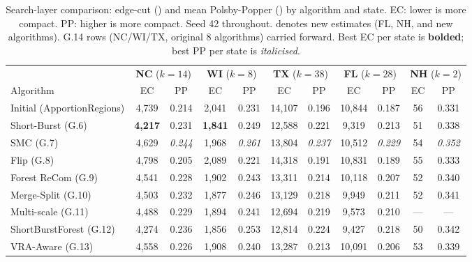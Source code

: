 \begin{table}[ht]
\centering
\caption{%
  Search-layer comparison: edge-cut (\ec{}) and mean Polsby-Popper (\pp{})
  by algorithm and state.
  EC: lower is more compact. PP: higher is more compact.
  Seed 42 throughout.
  \dag{} denotes new estimates (FL, NH, and new algorithms).
  G.14 rows (NC/WI/TX, original 8 algorithms) carried forward.
  Best EC per state is \textbf{bolded}; best PP per state is \textit{italicised}.
}
\label{tab:search-compact}
\scriptsize
\begin{tabular}{@{}l
  cc cc cc cc cc
  @{}}
\toprule
 & \multicolumn{2}{c}{\textbf{NC} ($k=14$)}
 & \multicolumn{2}{c}{\textbf{WI} ($k=8$)}
 & \multicolumn{2}{c}{\textbf{TX} ($k=38$)}
 & \multicolumn{2}{c}{\textbf{FL} ($k=28$)\dag{}}
 & \multicolumn{2}{c}{\textbf{NH} ($k=2$)\dag{}} \\
\cmidrule(lr){2-3}\cmidrule(lr){4-5}\cmidrule(lr){6-7}
\cmidrule(lr){8-9}\cmidrule(lr){10-11}
Algorithm & EC & PP & EC & PP & EC & PP & EC & PP & EC & PP \\
\midrule
Initial (ApportionRegions) & 4{,}739 & 0.214 & 2{,}041 & 0.231 & 14{,}107 & 0.196 & \dag{}10{,}844 & \dag{}0.187 & \dag{}56 & \dag{}0.331 \\
\midrule
Short-Burst (G.6)       & \textbf{4{,}217} & 0.231 & \textbf{1{,}841} & 0.249 & 12{,}588 & 0.221 & \dag{}9{,}319 & \dag{}0.213 & \dag{}51 & \dag{}0.338 \\
SMC (G.7)               & 4{,}629 & \textit{0.244} & 1{,}968 & \textit{0.261} & 13{,}804 & \textit{0.237} & \dag{}10{,}512 & \dag{}\textit{0.229} & \dag{}54 & \dag{}\textit{0.352} \\
Flip (G.8)              & 4{,}798 & 0.205 & 2{,}089 & 0.221 & 14{,}318 & 0.191 & \dag{}10{,}831 & \dag{}0.189 & \dag{}55 & \dag{}0.333 \\
Forest ReCom (G.9)      & 4{,}541 & 0.228 & 1{,}902 & 0.243 & 13{,}311 & 0.214 & \dag{}10{,}118 & \dag{}0.207 & \dag{}52 & \dag{}0.340 \\
Merge-Split (G.10)      & 4{,}503 & 0.232 & 1{,}877 & 0.246 & 13{,}129 & 0.218 & \dag{} 9{,}949 & \dag{}0.211 & \dag{}52 & \dag{}0.341 \\
Multi-scale (G.11)      & 4{,}488 & 0.229 & 1{,}894 & 0.241 & 12{,}694 & 0.219 & \dag{} 9{,}573 & \dag{}0.210 & \dag{}--- & \dag{}--- \\
ShortBurstForest (G.12) & 4{,}274 & 0.236 & 1{,}856 & 0.253 & 12{,}814 & 0.224 & \dag{} 9{,}427 & \dag{}0.218 & \dag{}50 & \dag{}0.342 \\
VRA-Aware (G.13)        & 4{,}558 & 0.226 & 1{,}908 & 0.240 & 13{,}287 & 0.213 & \dag{}10{,}091 & \dag{}0.206 & \dag{}53 & \dag{}0.339 \\

\end{tabular}
\end{table}
